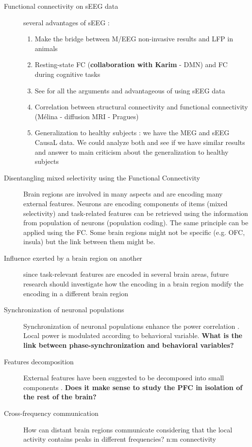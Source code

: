 \documentclass[a4paper,11pt]{article}
\begin{document}
\begin{description}
    \item[Functional connectivity on sEEG data] several advantages of sEEG :
    \begin{enumerate}
        \item Make the bridge between M/EEG non-invasive results and LFP in animals
        \item Resting-state FC (\textbf{collaboration with Karim} - DMN) and FC during cognitive tasks
        \item See \cite{helfrich2019cognitive} for all the arguments and advantageous of using sEEG data
        \item Correlation between structural connectivity and functional connectivity (Mélina - diffusion MRI - Pragues)
        \item Generalization to healthy subjects : we have the MEG and sEEG CausaL data. We could analyze both and see if we have similar results and answer to main criticism about the generalization to healthy subjects
    \end{enumerate}
    \item[Disentangling mixed selectivity using the Functional Connectivity] Brain regions are involved in many aspects and are encoding many external features. Neurons are encoding components of items (mixed selectivity) and task-related features can be retrieved using the information from population of neurons (population coding). The same principle can be applied using the FC. Some brain regions might not be specific (e.g. OFC, insula) but the link between them might be.
    \item[Influence exerted by a brain region on another] since task-relevant features are encoded in several brain areas, future research should investigate how the encoding in a brain region modify the encoding in a different brain region
    \item[Synchronization of neuronal populations] Synchronization of neuronal populations enhance the power correlation \citep{womelsdorf2007modulation}. Local power is modulated according to behavioral variable. \textbf{What is the link between phase-synchronization and behavioral variables?}
    \item[Features decomposition] External features have been suggested to be decomposed into small components \citep{o2021hierarchical}. \textbf{Does it make sense to study the PFC in isolation of the rest of the brain?}
    \item[Cross-frequency communication] How can distant brain regions communicate considering that the local activity contains peaks in different frequencies? n:m connectivity

\end{description}
\end{document}
